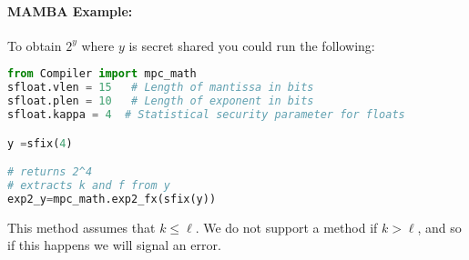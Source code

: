 \paragraph{MAMBA Example:} To obtain $2^y$ where $y$ is secret shared you could run the following: 
\begin{lstlisting}[language={python}]
from Compiler import mpc_math
sfloat.vlen = 15   # Length of mantissa in bits
sfloat.plen = 10   # Length of exponent in bits
sfloat.kappa = 4  # Statistical security parameter for floats

y =sfix(4)

# returns 2^4 
# extracts k and f from y
exp2_y=mpc_math.exp2_fx(sfix(y))
\end{lstlisting}

This method assumes that $k \le \ell$.
We do not support a method if $k > \ell$, and so if this happens
we will signal an error.

